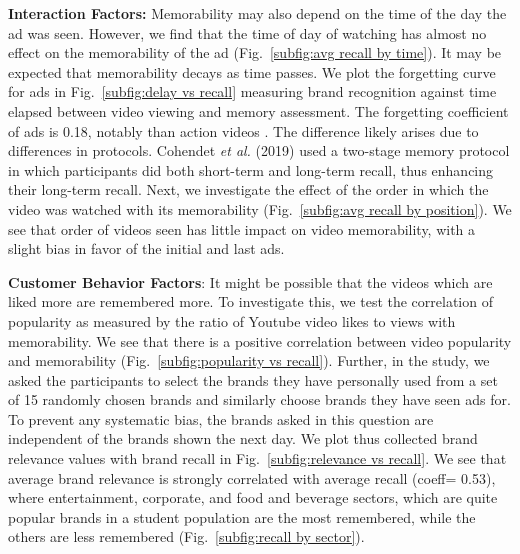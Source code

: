 \textbf{Interaction Factors:} Memorability may also depend on the time of the day the ad was seen. However, we find that the time of day of watching has almost no effect on the memorability of the ad (Fig.~\ref{subfig:avg recall by time}). It may be expected that memorability decays as time passes. We plot the forgetting curve for ads in Fig.~\ref{subfig:delay vs recall} measuring brand recognition against time elapsed between video viewing and memory assessment. The forgetting coefficient of ads is 0.18, notably than action videos \cite{cohendet2019videomem}. The difference likely arises due to differences in protocols. Cohendet \textit{et al.} (2019) \cite{cohendet2019videomem} used a two-stage memory protocol in which participants did both short-term and long-term recall, thus enhancing their long-term recall. 
Next, we investigate the effect of the order in which the video was watched with its memorability (Fig.~\ref{subfig:avg recall by position}). We see that order of videos seen has little impact on video memorability, with a slight bias in favor of the initial and last ads. %







\textbf{Customer Behavior Factors}: It might be possible that the videos which are liked more are remembered more. To investigate this, we test the correlation of popularity as measured by the ratio of Youtube video likes to views with memorability. We see that there is a positive correlation between video popularity and memorability (Fig.~\ref{subfig:popularity vs recall}). Further, in the study, we asked the participants to select the brands they have personally used from a set of 15 randomly chosen brands and similarly choose brands they have seen ads for. To prevent any systematic bias, the brands asked in this question are independent of the brands shown the next day. We plot thus collected brand relevance values with brand recall in Fig.~\ref{subfig:relevance vs recall}. We see that average brand relevance is strongly correlated with average recall (coeff= 0.53), where entertainment, corporate, and food and beverage sectors, which are quite popular brands in a student population are the most remembered, while the others are less remembered (Fig.~\ref{subfig:recall by sector}).

